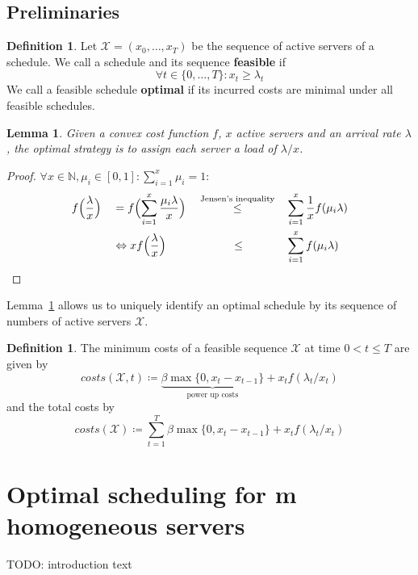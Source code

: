 \documentclass[hidelinks]{article}
\theoremstyle{plain}
\newtheorem{lem}[thm]{Lemma}
\theoremstyle{definition}
\newtheorem{defn}[thm]{Definition}
\theoremstyle{rem}
\newcommand{\mx}{\mathcal{X}}
\newcommand{\fromto}[2]{\{#1,\ldots,#2\}}
\begin{document}
\begin{sloppypar}
\subsection{Preliminaries}
\begin{defn} Let $\mx=(x_0,\ldots,x_T)$ be the sequence of active servers of a schedule. We call a schedule and its sequence \textbf{feasible} if 
\begin{equation*}
	\forall t\in\fromto{0}{T}: x_t\ge\lambda_t
\end{equation*}
We call a feasible schedule \textbf{optimal} if its incurred costs are minimal under all feasible schedules.
\end{defn}
\begin{lem}\label{lem:share}
	Given a convex cost function $f$, $x$ active servers and an arrival rate $\lambda$, the optimal strategy is to assign each server a load of $\lambda/x$.
\end{lem}
\begin{proof}
$\forall x\in\mathbb{N},\mu_i\in[0,1]:\sum\limits_{i=1}^{x}{\mu_i}=1:$
\begin{alignat*}{4}
	&f\Bigl(\frac{\lambda}{x}\Bigr)&&=f\Bigl(\sum\limits_{i=1}^x{\frac{\mu_i\lambda}{x}}\Bigr)&&\stackrel{\text{Jensen's inequality}}{\le}&&\sum\limits_{i=1}^x\frac{1}{x}f(\mu_i\lambda) \\
	&&&\Leftrightarrow xf\Bigl(\frac{\lambda}{x}\Bigr)&&\qquad\quad\le&&\sum\limits_{i=1}^xf(\mu_i\lambda)
\end{alignat*}
\end{proof}
Lemma~\ref{lem:share} allows us to uniquely identify an optimal schedule by its sequence of numbers of active servers $\mx$. 
\begin{defn}
The minimum costs of a feasible sequence $\mx$ at time $0<t\le T$ are given by
\begin{equation}
	costs(\mx,t)\coloneqq\underbrace{\beta\max\{0,x_{t}-x_{t-1}\}}_{\text{power up costs}}+x_tf(\lambda_t/x_t)\label{eq:costs_t_chi_prime}
\end{equation}
and the total costs by
\begin{equation*}
	costs(\mx)\coloneqq\sum\limits_{t=1}^{T}{\beta\max\{0,x_{t}-x_{t-1}\}+x_tf(\lambda_t/x_t)}
\end{equation*}
\end{defn}

\section{Optimal scheduling for m homogeneous servers}\label{sec:opt}
TODO: introduction text


\end{sloppypar}
\end{document}
